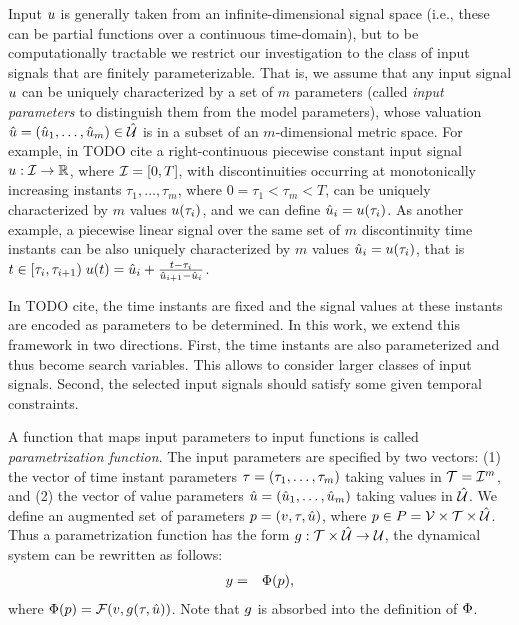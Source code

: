 Input $u$ is generally taken from an infinite-dimensional signal space (i.e., these can be partial functions over a continuous time-domain), but to be computationally tractable we restrict our investigation to the class of input signals that are finitely parameterizable. That is, we assume that any input signal $u$ 
can be uniquely characterized by a set of $m$ parameters (called {\em input parameters} to distinguish them from the model parameters), whose valuation $\hat{u} =(\hat{u}_1,\ldots,\hat{u}_m) \in \hat{\mathcal{U}}$ is in a subset of an $m$-dimensional metric space. For example, in \cite{} {\color{red} TODO cite} a right-continuous piecewise constant input signal $u:\mathcal{I} \rightarrow \mathbb{R}$, where $\mathcal{I}=[ 0,T ]$, with discontinuities occurring at monotonically increasing instants $\tau_1,\ldots, \tau_m$, where $0=\tau_1<\tau_m<T$, can be uniquely characterized by $m$ values $u(\tau_i)$, and we can define $\hat{u}_i=u(\tau_i)$. As another example, a piecewise linear signal over the same set of $m$ discontinuity time instants can be also uniquely characterized by $m$ values $\hat{u}_i = u(\tau_i)$, that is $t \in [\tau_i, \tau_{i+1}) \;  u(t) = \hat{u}_i  + \frac{t -  \tau_i}{\hat{u}_{i+1} - \hat{u}_i}$.

In \cite{} {\color{red} TODO cite}, the time instants are fixed and the signal values at these instants are encoded as parameters to be determined. In this work, we extend this framework in two directions. First, the time instants are also parameterized and thus become search variables. This allows to consider larger classes of input signals. Second, the selected input signals should satisfy some given temporal constraints.%

A function that maps input parameters to input functions is called {\em parametrization function}. The input parameters are specified by two vectors: (1) the vector of time instant parameters $\tau = (\tau_1,\ldots, \tau_m)$ taking values in $\mathcal{T}=\mathcal{I}^m$, and (2) the vector of value parameters $\hat{u}= (\hat{u}_1, \ldots, \hat{u}_m)$ taking values in $\hat{\mathcal{U}}$. We define an augmented set of parameters $p = (v, \tau, \hat{u})$, where $p \in P = \mathcal{V} \times \mathcal{T}  \times \hat{\mathcal{U}}$. Thus a parametrization function has the form $g: \mathcal{T} \times \hat{\mathcal{U}} \rightarrow \mathcal{U}$, the dynamical system can be rewritten as follows:
\begin{eqnarray} \label{eq:behaviorfunc}
y &=& \Phi(p),
\end{eqnarray}
where $\Phi(p) = \mathcal{F} (v, g(\tau, \hat{u}))$.  Note that $g$ is absorbed into the definition of $\Phi$.


